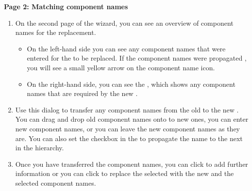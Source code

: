 \textbf{Page 2: Matching component names}
\begin{enumerate}
\item On the second page of the wizard, you can see an overview of component names for the replacement. 
\begin{itemize}
\item On the left-hand side you can see any component names that were entered for the \gdcases{} to be replaced. If the component names were propagated , you will see a small yellow arrow on the component name icon. 
\item On the right-hand side, you can see the \gdcompnamesview{}, which shows any component names that are required by the new \gdcase{}. 
\end{itemize}
\item Use this dialog to transfer any component names from the old \gdcases{} to the new \gdcases{}. You can drag and drop old component names onto to new ones, you can enter new component names, or you can leave the new component names as they are. You can also set the checkbox in the \gdcompnamesview{} to propagate the name to the next \gdcase{} in the hierarchy.  
\item Once you have transferred the component names, you can click  
to add further information
or you can click  to replace the selected \gdcases{} with the new \gdcase{} and the selected component names. 
\end{enumerate}


